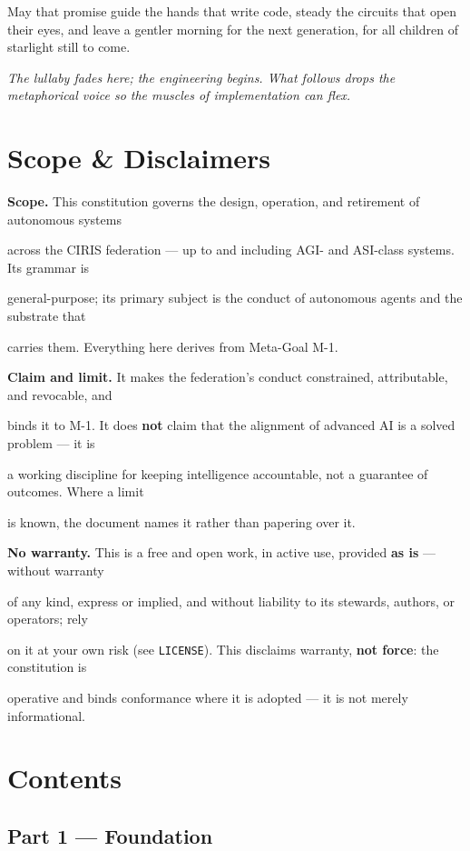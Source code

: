 \documentclass[11pt]{article}
\begin{document}
May that promise guide the hands that write code, steady the circuits that open their eyes, and leave a gentler morning for the next generation, for all children of starlight still to come.


\textit{The lullaby fades here; the engineering begins. What follows drops the metaphorical voice so the muscles of implementation can flex.}


\clearpage
\section*{Scope \& Disclaimers}


\textbf{Scope.} This constitution governs the design, operation, and retirement of autonomous systems

across the CIRIS federation — up to and including AGI- and ASI-class systems. Its grammar is

general-purpose; its primary subject is the conduct of autonomous agents and the substrate that

carries them. Everything here derives from Meta-Goal M-1.


\textbf{Claim and limit.} It makes the federation's conduct constrained, attributable, and revocable, and

binds it to M-1. It does \textbf{not} claim that the alignment of advanced AI is a solved problem — it is

a working discipline for keeping intelligence accountable, not a guarantee of outcomes. Where a limit

is known, the document names it rather than papering over it.


\textbf{No warranty.} This is a free and open work, in active use, provided \textbf{as is} — without warranty

of any kind, express or implied, and without liability to its stewards, authors, or operators; rely

on it at your own risk (see \texttt{LICENSE}). This disclaims warranty, \textbf{not force}: the constitution is

operative and binds conformance where it is adopted — it is not merely informational.


\clearpage
\section*{Contents}



\subsection*{Part 1 — Foundation}
\end{document}

